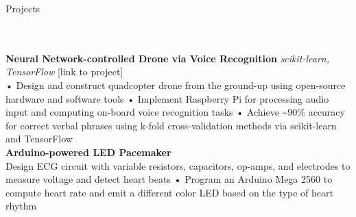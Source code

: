 \documentclass[a4paper]{article}
\newcommand{\lineunder} {
    \vspace*{-8pt} \\
    \hspace*{-18pt} \hrulefill \\
}
\newcommand{\header} [1] {
    {\hspace*{-18pt}\vspace*{6pt} \Large{#1} }
    \vspace*{-6pt} 
    \lineunder
}
\begin{document}
\header{Projects}
{\textbf{Neural Network-controlled Drone via Voice Recognition}} {\sl scikit-learn, TensorFlow} \hfill [link to project]\\
• Design and construct quadcopter drone from the ground-up using open-source hardware and software tools • Implement Raspberry Pi for processing audio input and computing on-board voice recognition tasks • Achieve \textasciitilde{}90\% accuracy for correct verbal phrases using k-fold cross-validation methods via scikit-learn and TensorFlow\\
\vspace*{2mm}
{\textbf{Arduino-powered LED Pacemaker}}\\
Design ECG circuit with variable resistors, capacitors, op-amps, and electrodes to measure voltage and detect heart beats • Program an Arduino Mega 2560 to compute heart rate and emit a different color LED based on the type of heart rhythm\\
\vspace*{2mm}



\ 
\end{document}
